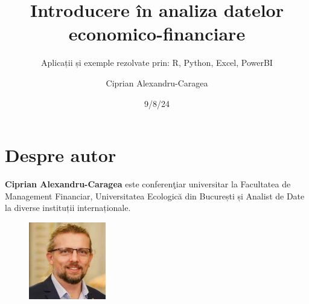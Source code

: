 \documentclass[
  11pt,
  b5paper,
  nottoc]{book}
\title{Introducere în analiza datelor economico-financiare}
\subtitle{Aplicații și exemple rezolvate prin: R, Python, Excel,
PowerBI}
\author{Ciprian Alexandru-Caragea}
\date{9/8/24}
\renewcommand{\contentsname}{Cuprins}
\renewcommand*\contentsname{Table of contents}
\newcommand\contentsname{Table of contents}
\begin{document}
\frontmatter
\maketitle
\ifdefined\Shaded\renewenvironment{Shaded}{\begin{tcolorbox}[interior hidden, enhanced, borderline west={3pt}{0pt}{shadecolor}, boxrule=0pt, breakable, sharp corners, frame hidden]}{\end{tcolorbox}}\fi

\renewcommand*\contentsname{Cuprins}
{
\setcounter{tocdepth}{1}
\tableofcontents
}
\listoffigures
\listoftables
\mainmatter
{}

\hypertarget{despre-autor}{%
\chapter*{Despre autor}\label{despre-autor}}


\setcounter{page}{3}

\textbf{Ciprian Alexandru-Caragea} este conferenţiar universitar la
Facultatea de Management Financiar, Universitatea Ecologică din
București și Analist de Date la diverse instituții internaționale.\\

\begin{figure}
  \begin{center}
    \includegraphics[width=0.3\textwidth]{images/Ciprian_DGINS2018.jpg}
  \end{center}
\end{figure}
\end{document}
